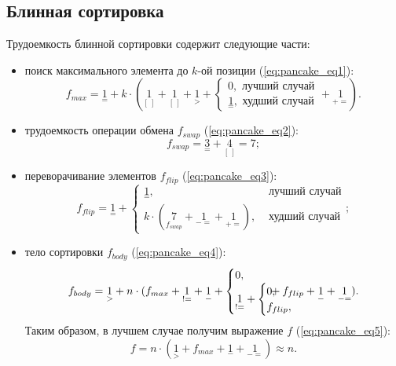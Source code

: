 \subsection{Блинная сортировка}
Трудоемкость блинной сортировки содержит следующие части:
\begin{itemize}
	\item поиск максимального элемента до $k$-ой позиции (\ref{eq:pancake_eq1}):
	\begin{equation}
		\label{eq:pancake_eq1}
		f_{max} = {\underset{=}{1}} + k \cdot ({\underset{[\ ]}{1}} + {\underset{[\ ]}{1}} + {\underset{>}{1}} +\begin{cases}
			0, \text{  лучший случай}\\
			{\underset{=}{1}}, \text{  худший случай}
		\end{cases} + {\underset{+=}{1}}).
	\end{equation}

	\item трудоемкость операции обмена $f_{swap}$ (\ref{eq:pancake_eq2}): 
	\begin{equation}
		\label{eq:pancake_eq2}
		f_{swap} = {\underset{=}{3}} + {\underset{[\ ]}{4}} = 7;
	\end{equation}

	\item переворачивание элементов $f_{flip}$ (\ref{eq:pancake_eq3}):
	\begin{equation}
		\label{eq:pancake_eq3}
		f_{flip} = {\underset{=}{1}} + \begin{cases}
			{\underset{=}{1}}, &\text{  лучший случай}\\
			k \cdot ({\underset{f_{swap}}{7}} + {\underset{-=}{1}} + {\underset{+=}{1}}),& \text{  худший случай}
		\end{cases};
	\end{equation} 

	\item тело сортировки $f_{body}$ (\ref{eq:pancake_eq4}):
	\begin{equation}
		\label{eq:pancake_eq4}
		f_{body} = {\underset{>}{1}} + n \cdot 
			({f_{max}} + {\underset{!=}{1}} + {\underset{-}{1}} +
			\begin{cases}
					0, \\
					{\underset{!=}{1}} + 
					\begin{cases}
						0, \\ 
						f_{flip},
					\end{cases} 
				\end{cases} \hspace{-1.5cm} +  f_{flip} + {\underset{-}{1}} + {\underset{-=}{1}}).
	\end{equation}
Таким образом, в лучшем случае получим выражение $f$ (\ref{eq:pancake_eq5}):
\begin{equation}
	\label{eq:pancake_eq5}
	f = n \cdot({\underset{>}{1}} + f_{max} + {\underset{-}{1}} + {\underset{-=}{1}}) \approx n.
\end{equation}


\end{itemize}
